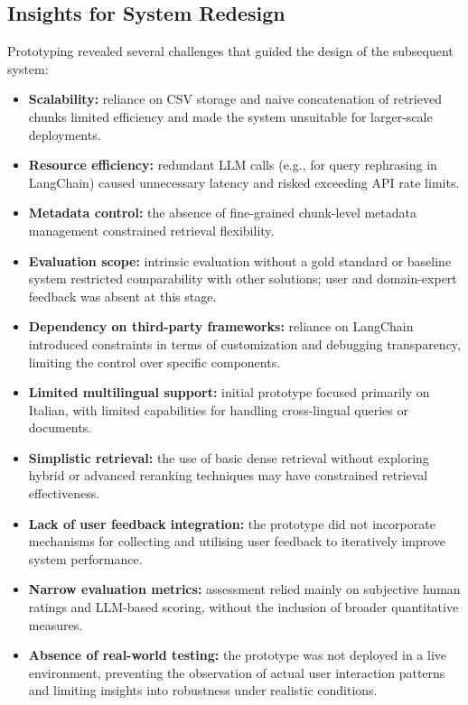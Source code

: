 \begin{spacing}{1.5}
\subsection{Insights for System Redesign}
Prototyping revealed several challenges that guided the design of the subsequent system:
\begin{itemize}
      \item \textbf{Scalability:} reliance on CSV storage and naive concatenation of retrieved chunks limited efficiency and made the system unsuitable for larger-scale deployments.
      \item \textbf{Resource efficiency:} redundant LLM calls (e.g., for query rephrasing in LangChain) caused unnecessary latency and risked exceeding API rate limits.
      \item \textbf{Metadata control:} the absence of fine-grained chunk-level metadata management constrained retrieval flexibility.
      \item \textbf{Evaluation scope:} intrinsic evaluation without a gold standard or baseline system restricted comparability with other solutions; user and domain-expert feedback was absent at this stage.
      \item \textbf{Dependency on third-party frameworks:} reliance on LangChain introduced constraints in terms of customization and debugging transparency, limiting the control over specific components.
      \item \textbf{Limited multilingual support:} initial prototype focused primarily on Italian, with limited capabilities for handling cross-lingual queries or documents.
      \item \textbf{Simplistic retrieval:} the use of basic dense retrieval without exploring hybrid or advanced reranking techniques may have constrained retrieval effectiveness.
      \item \textbf{Lack of user feedback integration:} the prototype did not incorporate mechanisms for collecting and utilising user feedback to iteratively improve system performance.
      \item \textbf{Narrow evaluation metrics:} assessment relied mainly on subjective human ratings and LLM-based scoring, without the inclusion of broader quantitative measures.
      \item \textbf{Absence of real-world testing:} the prototype was not deployed in a live environment, preventing the observation of actual user interaction patterns and limiting insights into robustness under realistic conditions.
\end{itemize}


\end{spacing}
